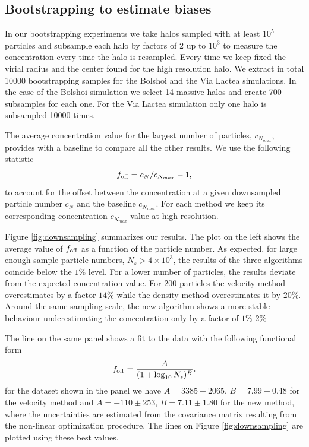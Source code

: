 \documentclass{emulateapj}
\begin{document}
\subsection{Bootstrapping to estimate biases}
\label{sec:bootstrapping}

In our bootstrapping experiments we take halos sampled with at least
$10^{5}$ particles and subsample each halo by factors of $2$ up to
$10^{3}$ to measure the concentration every time the halo is
resampled. 
Every time we keep fixed the virial radius and the center found for
the high resolution halo.
We extract in total 10000 bootstrapping samples for the Bolshoi
and the Via Lactea simulations.
In the case of the Bolshoi simulation we select 14 massive halos and
create 700 subsamples for each one. 
For the Via Lactea simulation only one halo is subsampled 10000
times. 

The average concentration value for the largest number of particles,
$c_{N_{max}}$, provides with a baseline to compare all the other
results.  
We use the following statistic
\begin{equation}
f_{\rm off} = c_{N} / c_{N_{max}} - 1,
\label{eq:f_off}
\end{equation}
to account for the offset between the concentration at a given
downsampled particle number $c_{N}$ and the baseline $c_{N_{max}}$.
For each method we keep its corresponding concentration $c_{N_{max}}$
value at high resolution. 


Figure \ref{fig:downsampling} summarizes our results.  
The plot on the left shows the average value of $f_{\rm off}$ as a
function of the particle number.  
As expected, for large enough sample particle numbers,
$N_{s}>4\times 10^3$, the results of the three algorithms coincide
below the $1\%$ level.
For a lower number of particles, the results deviate from the expected
concentration value.  
For $200$ particles the velocity method overestimates by a factor
$14\%$ while the density method overestimates it by $20\%$.
Around the same sampling scale, the new algorithm shows a more stable
behaviour underestimating the concentration only by a factor of
$1\%$-$2\%$


The line on the same panel shows a fit to the data with the following
functional form 
\begin{equation}
f_{\rm off} = \frac{A}{(1+\log_{10}N_s)^{B}}.
\label{eq:f_off_fit}
\end{equation} 
for the dataset shown in the panel we have $A=3385\pm 2065$, $B=7.99\pm0.48
$ for the velocity method and $A=-110\pm 253$, $B=7.11\pm1.80$ for the
new method, where the uncertainties are estimated from the covariance 
matrix resulting from the non-linear optimization procedure. The lines
on Figure \ref{fig:downsampling} are plotted using these best values. 
\end{document}

